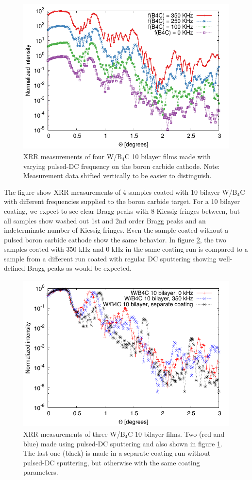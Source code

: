\begin{figure}[!h]
	\center
	\includegraphics[height=8cm]{figures/athena/coatings/w-b4c_pulsed_2.pdf}
\caption{\footnotesize XRR measurements of four W/B$_4$C 10 bilayer films made with varying pulsed-DC frequency on the boron carbide cathode. Note: Measurement data shifted vertically to be easier to distinguish.}\label{fig:wb4c-pulsed}
\end{figure}

The figure show XRR measurements of 4 samples coated with 10 bilayer W/B$_4$C with different frequencies supplied to the boron carbide target. For a 10 bilayer coating, we expect to see clear Bragg peaks with 8 Kiessig\cite{Kiessig:1931vo} fringes between, but all samples show washed out 1st and 2nd order Bragg peaks and an indeterminate number of Kiessig fringes. Even the sample coated without a pulsed boron carbide cathode show the same behavior. In figure \ref{fig:wb4c-nopulsed}, the two samples coated with 350 kHz and 0 kHz in the same coating run is compared to a sample from a different run coated with regular DC sputtering showing well-defined Bragg peaks as would be expected.

\begin{figure}[!h]
	\center
	\includegraphics[height=8cm]{figures/athena/coatings/w-b4c-nopulsed.pdf}
\caption{\footnotesize XRR measurements of three W/B$_4$C 10 bilayer films. Two (red and blue) made using pulsed-DC sputtering and also shown in figure \ref{fig:wb4c-pulsed}. The last one (black) is made in a separate coating run without pulsed-DC sputtering, but otherwise with the same coating parameters.}\label{fig:wb4c-nopulsed}
\end{figure}

